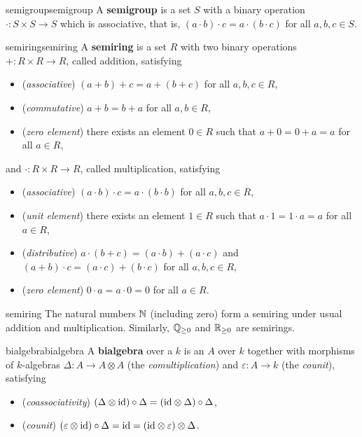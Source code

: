\begin{topic}{semigroup}{semigroup}
    A \textbf{semigroup} is a set $S$ with a binary operation $\cdot : S \times S \to S$ which is associative, that is, $(a \cdot b) \cdot c = a \cdot (b \cdot c)$ for all $a, b, c \in S$.
\end{topic}

\begin{topic}{semiring}{semiring}
    A \textbf{semiring} is a set $R$ with two binary operations $+ : R \times R \to R$, called addition, satisfying
    \begin{itemize}
        \item (\textit{associative}) $(a + b) + c = a + (b + c)$ for all $a, b, c \in R$,
        \item (\textit{commutative}) $a + b = b + a$ for all $a, b \in R$,
        \item (\textit{zero element}) there exists an element $0 \in R$ such that $a + 0 = 0 + a = a$ for all $a \in R$,
    \end{itemize}
    and $\cdot : R \times R \to R$, called multiplication, satisfying
    \begin{itemize}
        \item (\textit{associative}) $(a \cdot b) \cdot c = a \cdot (b \cdot b)$ for all $a, b, c \in R$,
        \item (\textit{unit element}) there exists an element $1 \in R$ such that $a \cdot 1 = 1 \cdot a = a$ for all $a \in R$,
        \item (\textit{distributive}) $a \cdot (b + c) = (a \cdot b) + (a \cdot c)$ and $(a + b) \cdot c = (a \cdot c) + (b \cdot c)$ for all $a, b, c \in R$,
        \item (\textit{zero element}) $0 \cdot a = a \cdot 0 = 0$ for all $a \in R$.
    \end{itemize}
\end{topic}

\begin{example}{semiring}
    The natural numbers $\mathbb{N}$ (including zero) form a semiring under usual addition and multiplication. Similarly, $\mathbb{Q}_{\ge 0}$ and $\mathbb{R}_{\ge 0}$ are semirings.
\end{example}

\begin{topic}{bialgebra}{bialgebra}
    A \textbf{bialgebra} over a  $k$ is an  $A$ over $k$ together with morphisms of $k$-algebras $\Delta : A \to A \otimes A$ (the \textit{comultiplication}) and $\varepsilon : A \to k$ (the \textit{counit}), satisfying
    \begin{itemize}
        \item (\textit{coassociativity}) $(\Delta \otimes \textup{id}) \circ \Delta = (\textup{id} \otimes \Delta) \circ \Delta$,
        \item (\textit{counit}) $(\varepsilon \otimes \textup{id}) \circ \Delta = \textup{id} = (\textup{id} \otimes \varepsilon) \otimes \Delta$.
    \end{itemize}
\end{topic}


